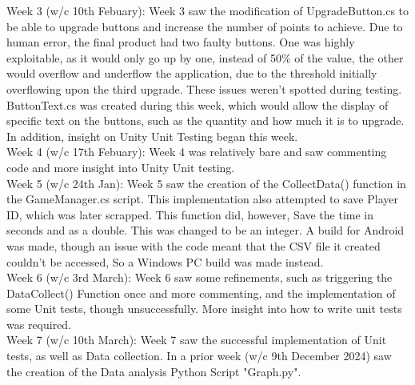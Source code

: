 \documentclass[conference]{IEEEtran}
\begin{document}
Week 3 (w/c 10th Febuary):
Week 3 saw the modification of UpgradeButton.cs to be able to upgrade buttons and increase the number of points to achieve. Due to human error, the final product had two faulty buttons. One was highly exploitable, as it would only go up by one, instead of 50\% of the value, the other would overflow and underflow the application, due to the threshold initially overflowing upon the third upgrade. These issues weren't spotted during testing. ButtonText.cs was created during this week, which would allow the display of specific text on the buttons, such as the quantity and how much it is to upgrade. In addition, insight on Unity Unit Testing began this week.\\

Week 4 (w/c 17th Febuary):
Week 4  was relatively bare and saw commenting code and more insight into Unity Unit testing.\\

Week 5 (w/c 24th Jan):
Week 5 saw the creation of the CollectData() function in the GameManager.cs script. This implementation also attempted to save Player ID, which was later scrapped. This function did, however, Save the time in seconds and as a double. This was changed to be an integer. A build for Android was made, though an issue with the code meant that the CSV file it created couldn't be accessed, So a Windows PC build was made instead.\\

Week 6 (w/c 3rd March):
Week 6 saw some refinements, such as triggering the DataCollect() Function once and more commenting, and the implementation of some Unit tests, though unsuccessfully. More insight into how to write unit tests was required.\\

Week 7 (w/c 10th March):
Week 7 saw the successful implementation of Unit tests, as well as Data collection. In a prior week (w/c 9th December 2024) saw the creation of the Data analysis Python Script "Graph.py".\\
\end{document}
